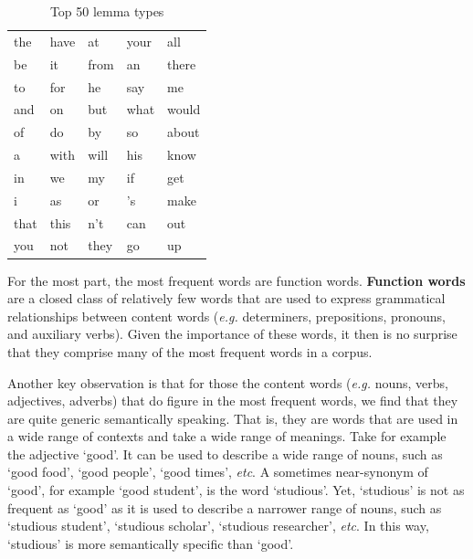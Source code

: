 \documentclass[
  letterpaper,
  krantz1]{latex/krantz-mod}
\theoremstyle{definition}
\theoremstyle{definition}
\theoremstyle{remark}
\begin{document}
\begin{longtable}[]{@{}
  >{\raggedright\arraybackslash}p{}
  >{\raggedright\arraybackslash}p{}
  >{\raggedright\arraybackslash}p{}
  >{\raggedright\arraybackslash}p{}
  >{\raggedright\arraybackslash}p{}@{}}

\caption{\label{tbl-explore-masc-count-top-50}Top 50 lemma types}

\tabularnewline

\toprule\noalign{}
\endhead
\bottomrule\noalign{}
\endlastfoot
the & have & at & your & all \\
be & it & from & an & there \\
to & for & he & say & me \\
and & on & but & what & would \\
of & do & by & so & about \\
a & with & will & his & know \\
in & we & my & if & get \\
i & as & or & 's & make \\
that & this & n't & can & out \\
you & not & they & go & up \\

\end{longtable}

For the most part, the most frequent words are function words.
\textbf{Function words} are a closed class of
relatively few words that are used to express grammatical relationships
between content words (\emph{e.g.} determiners, prepositions, pronouns,
and auxiliary verbs). Given the importance of these words, it then is no
surprise that they comprise many of the most frequent words in a corpus.

Another key observation is that for those the content
words (\emph{e.g.} nouns, verbs, adjectives,
adverbs) that do figure in the most frequent words, we find that they
are quite generic semantically speaking. That is, they are words that
are used in a wide range of contexts and take a wide range of meanings.
Take for example the adjective `good'. It can be used to describe a wide
range of nouns, such as `good food', `good people', `good times',
\emph{etc}. A sometimes near-synonym of `good', for example `good
student', is the word `studious'. Yet, `studious' is not as frequent as
`good' as it is used to describe a narrower range of nouns, such as
`studious student', `studious scholar', `studious researcher',
\emph{etc}. In this way, `studious' is more semantically specific than
`good'.
\end{document}
